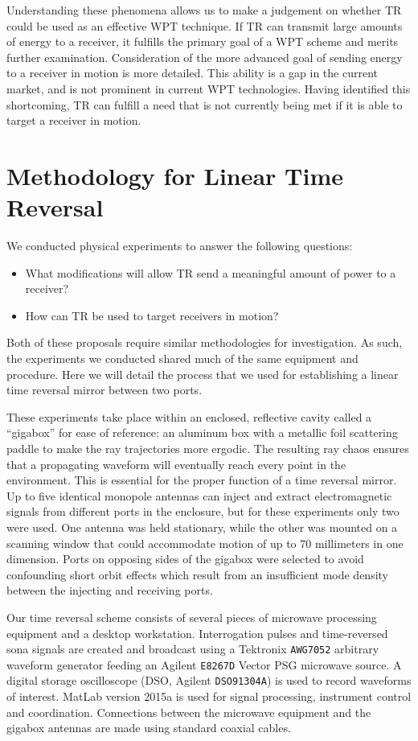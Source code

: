 Understanding these phenomena allows us to make a judgement on whether TR could be used as an effective WPT technique. If TR can transmit large amounts of energy to a receiver, it fulfills the primary goal of a WPT scheme and merits further examination. Consideration of the more advanced goal of sending energy to a receiver in motion is more detailed. This ability is a gap in the current market, and is not prominent in current WPT technologies. Having identified this shortcoming, TR can fulfill a need that is not currently being met if it is able to target a receiver in motion.

\section{Methodology for Linear Time Reversal}
\label{sec:ltr-meth}

We conducted physical experiments to answer the following questions:
\begin{itemize}
    \item What modifications will allow TR send a meaningful amount of power to a receiver?
    \item How can TR be used to target receivers in motion?
\end{itemize}
Both of these proposals require similar methodologies for investigation. As such, the experiments we conducted shared much of the same equipment and procedure. Here we will detail the process that we used for establishing a linear time reversal mirror between two ports.

These experiments take place within an enclosed, reflective cavity called a ``gigabox'' for ease of reference: an aluminum box with a metallic foil scattering paddle to make the ray trajectories more ergodic. The resulting ray chaos ensures that a propagating waveform will eventually reach every point in the environment. This is essential for the proper function of a time reversal mirror. Up to five identical monopole antennas can inject and extract electromagnetic signals from different ports in the enclosure, but for these experiments only two were used. One antenna was held stationary, while the other was mounted on a scanning window that could accommodate motion of up to 70 millimeters in one dimension. Ports on opposing sides of the gigabox were selected to avoid confounding short orbit effects which result from an insufficient mode density between the injecting and receiving ports.

Our time reversal scheme consists of several pieces of microwave processing equipment and a desktop workstation. Interrogation pulses and time-reversed sona signals are created and broadcast using a Tektronix \texttt{AWG7052} arbitrary waveform generator feeding an Agilent \texttt{E8267D} Vector PSG microwave source. A digital storage oscilloscope (DSO, Agilent \texttt{DSO91304A}) is used to record waveforms of interest. MatLab version 2015a is used for signal processing, instrument control and coordination. Connections between the microwave equipment and the gigabox antennas are made using standard coaxial cables.

